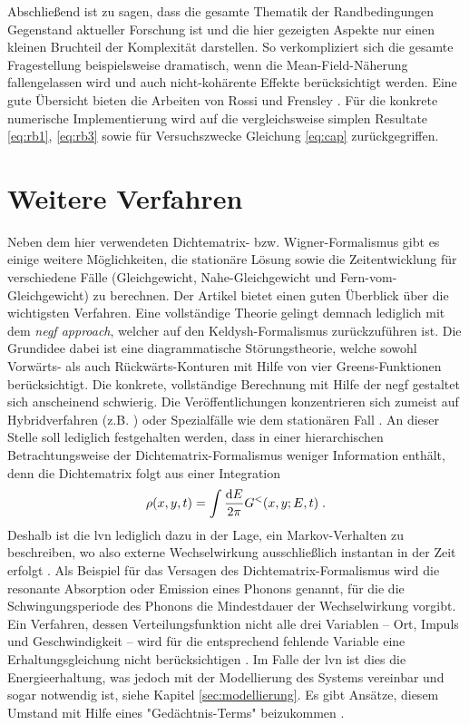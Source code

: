 Abschließend ist zu sagen, dass die gesamte Thematik der Randbedingungen Gegenstand aktueller Forschung ist und die hier gezeigten Aspekte nur einen kleinen Bruchteil der Komplexität darstellen. So verkompliziert sich die gesamte Fragestellung beispielsweise dramatisch, wenn die Mean-Field-Näherung fallengelassen wird und auch nicht-kohärente Effekte berücksichtigt werden. Eine gute Übersicht bieten die Arbeiten von Rossi \cite{buchRossi} und Frensley \cite{frensley}. Für die konkrete numerische Implementierung wird auf die vergleichsweise simplen Resultate \eqref{eq:rb1}, \eqref{eq:rb3} sowie für Versuchszwecke Gleichung \eqref{eq:cap} zurückgegriffen.

\section{Weitere Verfahren}\label{sec:weitere_verfahren}
Neben dem hier verwendeten Dichtematrix- bzw. Wigner-Formalismus gibt es einige weitere Möglichkeiten, die stationäre Lösung sowie die Zeitentwicklung für verschiedene Fälle (Gleichgewicht, Nahe-Gleichgewicht und Fern-vom-Gleichgewicht) zu berechnen. Der Artikel \cite{frensley3} bietet einen guten Überblick über die wichtigsten Verfahren. Eine vollständige Theorie gelingt demnach lediglich mit dem \emph{\ac{negf} approach}, welcher auf den Keldysh-Formalismus zurückzuführen ist. Die Grundidee dabei ist eine diagrammatische Störungstheorie, welche sowohl Vorwärts- als auch Rückwärts-Konturen mit Hilfe von vier Greens-Funktionen berücksichtigt. Die konkrete, vollständige Berechnung mit Hilfe der \ac{negf} gestaltet sich anscheinend schwierig. Die Veröffentlichungen konzentrieren sich zumeist auf Hybridverfahren (z.B. \cite{memory2, negf-dft}) oder Spezialfälle wie dem stationären Fall \cite{negf_datta}.
An dieser Stelle soll lediglich festgehalten werden, dass in einer hierarchischen Betrachtungsweise der Dichtematrix-Formalismus weniger Information enthält, denn die Dichtematrix folgt aus einer Integration
\begin{equation*}
  \rho(x,y,t) = \int \frac{\mathop{}\!\mathrm{d} E}{2\pi}G^{<}(x,y;E,t) \; .
\end{equation*}
Deshalb ist die \ac{lvn} lediglich dazu in der Lage, ein Markov-Verhalten zu beschreiben, wo also externe Wechselwirkung ausschließlich instantan in der Zeit erfolgt \cite{frensley3}. Als Beispiel für das Versagen des Dichtematrix-Formalismus wird die resonante Absorption oder Emission eines Phonons genannt, für die die Schwingungsperiode des Phonons die Mindestdauer der Wechselwirkung vorgibt. Ein Verfahren, dessen Verteilungsfunktion nicht alle drei Variablen -- Ort, Impuls und Geschwindigkeit -- wird für die entsprechend fehlende Variable eine Erhaltungsgleichung nicht berücksichtigen \cite{frensley3}. Im Falle der \ac{lvn} ist dies die Energieerhaltung, was jedoch mit der Modellierung des Systems vereinbar und sogar notwendig ist, siehe Kapitel \ref{sec:modellierung}. Es gibt Ansätze, diesem Umstand mit Hilfe eines "Gedächtnis-Terms" beizukommen \cite{memory1, memory2}.

